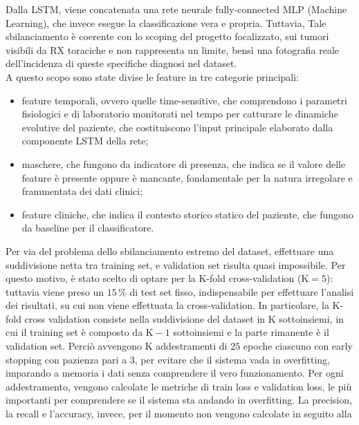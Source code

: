\documentclass[10pt,a4paper]{article}
\begin{document}
        Dalla LSTM, viene concatenata una rete neurale fully-connected MLP (Machine Learning), che invece esegue la 
        classificazione vera e propria. Tuttavia, Tale sbilanciamento è coerente con lo scoping del progetto focalizzato,
        sui tumori visibili da RX toraciche e non rappresenta un limite, bensì una fotografia reale dell'incidenza di queste
        specifiche diagnosi nel dataset.\\
        A questo scopo sono state divise le feature in tre categorie principali:
        \begin{itemize}
            \item feature temporali, ovvero quelle time-sensitive, che comprendono i parametri 
            fisiologici e di laboratorio monitorati nel tempo per catturare le dinamiche evolutive del paziente, che 
             costituiscono l'input principale elaborato dalla componente LSTM della rete;
            \item maschere, che fungono da indicatore di presenza, che indica se il valore delle feature è presente
                  oppure è mancante, fondamentale per la natura irregolare e frammentata dei dati clinici;
            \item feature cliniche, che indica il contesto storico statico del paziente, che fungono da baseline per il
                classificatore.
        \end{itemize}
        Per via del problema dello sbilanciamento estremo del dataset, effettuare una suddivisione netta tra training set,
        e validation set risulta quasi impossibile. Per questo motivo, è stato scelto di optare per la K-fold
        cross-validation ($\text{K}=5$): tuttavia viene preso un $15 \, \%$ di test set fisso, indispensabile per effettuare
        l'analisi dei risultati, su cui non viene effettuata la cross-validation. In particolare, la K-fold cross validation consiste nella suddivisione del dataset in 
        $\text{K}$ sottoinsiemi, in cui il training set è composto da $\text{K}-1$ sottoinsiemi e la parte rimanente è il validation set.
        Perciò avvengono $\text{K}$ addestramenti di $25$ epoche ciascuno con early stopping con pazienza pari a $3$, per evitare
        che il sistema vada in overfitting, imparando a memoria i dati senza comprendere il vero funzionamento. Per ogni
        addestramento, vengono calcolate le metriche di train loss e validation loss, le più importanti per comprendere se
        il sistema sta andando in overfitting. La precision, la recall e l'accuracy, invece, per il momento non vengono calcolate in seguito alla
\end{document}
